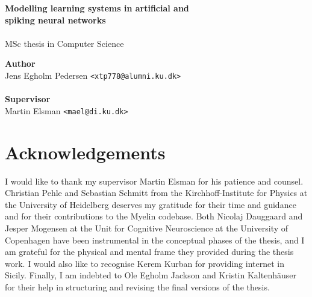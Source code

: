 \documentclass[a4paper,oneside]{memoir}
\begin{document}
\newcommand{\obar}{%
    \mathrel{\reflectbox{\rotatebox[origin=c]{90}{$\ominus$}}}}

    \thispagestyle{empty}
    \begin{adjustwidth}{-3cm}{-1.5cm}
      \vspace*{3cm}
      \textbf{\Huge Modelling learning systems in artificial and \\spiking
      neural networks} \\
      \\[1.6cm]
      {\Large MSc thesis in Computer Science}
      \\[9cm]
      \begin{tabbing}
      \textbf{\Large Author} \\
      Jens Egholm Pedersen \hspace{1cm} \= \texttt{<xtp778@alumni.ku.dk>} \\
      \\[1cm]
      \textbf{\Large Supervisor} \\
      Martin Elsman \hspace{1cm} \= \texttt{<mael@di.ku.dk>}
      \end{tabbing}
    \end{adjustwidth}

    \newpage

    \ClearWallPaper

\renewcommand\cftchapteraftersnumb{\normalfont}
\renewcommand\cftbeforechapterskip{5pt plus 1pt}

\frontmatter

\begin{abstract}

\end{abstract}

\pagebreak

\setcounter{tocdepth}{2}
\tableofcontents*
\newpage

\chapter*{Acknowledgements}
I would like to thank my supervisor Martin Elsman for his patience and counsel. 
Christian Pehle and Sebastian Schmitt from the Kirchhoff-Institute for Physics
at the University of Heidelberg deserves my gratitude for their time and
guidance and for their contributions to the Myelin codebase.
Both Nicolaj Dauggaard and Jesper Mogensen at the Unit for Cognitive
Neuroscience at the University of Copenhagen have been instrumental in the
conceptual phases of the thesis, and I am grateful for the physical and mental
frame they provided during the thesis work.
I would also like to recognise Kerem Kurban for providing internet in Sicily.
Finally, I am indebted to Ole Egholm Jackson and Kristin Kaltenhäuser for
their help in structuring and revising the final versions of the thesis.
\mainmatter
\end{document}
